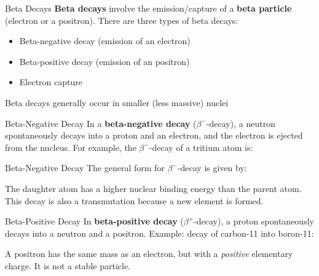 \documentclass[12pt,compress,aspectratio=169]{beamer}
\begin{document}
\begin{frame}{Beta Decays}
  \textbf{Beta decays} involve the emission/capture of a \textbf{beta particle}
  (electron or a positron). There are three types of beta decays:
  \begin{itemize}
  \item Beta-negative decay (emission of an electron)
  \item Beta-positive decay (emission of an positron)
  \item Electron capture
  \end{itemize}
  Beta decays generally occur in smaller (less massive) nuclei
\end{frame}



\begin{frame}{Beta-Negative Decay}
  In a \textbf{beta-negative decay} ($\beta^-$-decay), a neutron spontaneously
  decays into a proton and an electron, and the electron is ejected from the
  nucleus. For example, the $\beta^-$-decay of a tritium atom is:
  \begin{center}
  \end{center}

\end{frame}



\begin{frame}{Beta-Negative Decay}
  The general form for $\beta^-$-decay is given by:
  

  The daughter atom has a higher nuclear binding energy than the parent atom.
  This decay is also a transmutation because a new element is formed.
\end{frame} 



\begin{frame}{Beta-Positive Decay}
  In \textbf{beta-positive decay} ($\beta^+$-decay), a proton spontaneously
  decays into a neutron and a positron. Example: decay of carbon-11 into
  boron-11:
  \begin{center}
  \end{center}


  A positron has the same mass as an electron, but with a \emph{positive}
  elementary charge. It is not a stable particle.
\end{frame}
\end{document}
